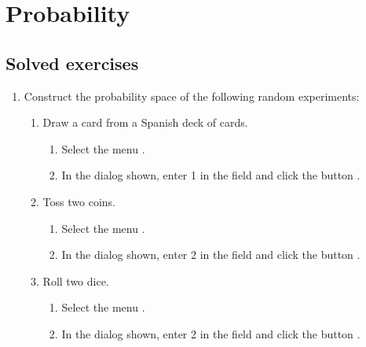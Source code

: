 
\chapter{Probability}\label{cha:probability}

\section{Solved exercises}
\begin{enumerate}[leftmargin=*] 
\item Construct the probability space of the following random experiments:
\begin{enumerate}
\item Draw a card from a Spanish deck of cards. 
\begin{indication}
\begin{enumerate}
\item Select the menu .
\item In the dialog shown, enter 1 in the field  and click the button . 
\end{enumerate}
\end{indication}
\item Toss two coins.
\begin{indication}
\begin{enumerate}
\item Select the menu .
\item In the dialog shown, enter 2 in the field  and click the button .
\end{enumerate}
\end{indication}

\item Roll two dice. 
\begin{indication}
\begin{enumerate}
\item Select the menu .
\item In the dialog shown, enter 2 in the field  and click the button .
\end{enumerate}
\end{indication}


\end{enumerate}
\end{enumerate}
